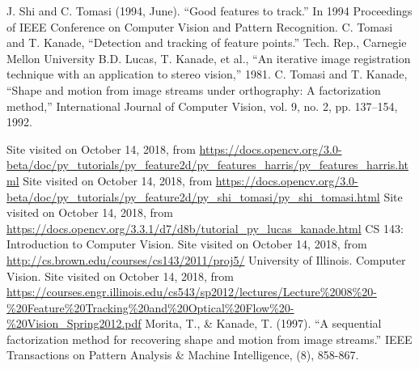 \documentclass[]{IEEEtran}
\begin{document}
\begin{thebibliography}{00}
     J. Shi and C. Tomasi (1994, June). ``Good features to track.'' In 1994 Proceedings of IEEE Conference on Computer Vision and Pattern Recognition.
     C. Tomasi and T. Kanade, ``Detection and tracking of feature points.'' Tech. Rep., Carnegie Mellon University
     B.D. Lucas, T. Kanade, et al., ``An iterative image registration technique with an application to stereo vision,'' 1981.
     C. Tomasi and T. Kanade, ``Shape and motion from image streams under orthography: A factorization method,'' International Journal of Computer Vision, vol. 9, no. 2, pp. 137–154, 1992.

     Site visited on October 14, 2018, from \url{https://docs.opencv.org/3.0-beta/doc/py_tutorials/py_feature2d/py_features_harris/py_features_harris.html}
     Site visited on October 14, 2018, from \url{https://docs.opencv.org/3.0-beta/doc/py_tutorials/py_feature2d/py_shi_tomasi/py_shi_tomasi.html}
     Site visited on October 14, 2018, from \url{https://docs.opencv.org/3.3.1/d7/d8b/tutorial_py_lucas_kanade.html}
     CS 143: Introduction to Computer Vision. Site visited on October 14, 2018, from \url{http://cs.brown.edu/courses/cs143/2011/proj5/}
     University of Illinois. Computer Vision. Site visited on October 14, 2018, from \url{https://courses.engr.illinois.edu/cs543/sp2012/lectures/Lecture%2008%20-%20Feature%20Tracking%20and%20Optical%20Flow%20-%20Vision_Spring2012.pdf}
     Morita, T., \& Kanade, T. (1997). ``A sequential factorization method for recovering shape and motion from image streams.'' IEEE Transactions on Pattern Analysis \& Machine Intelligence, (8), 858-867.


\end{thebibliography}
\end{document}
